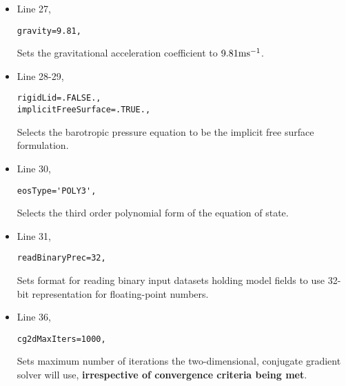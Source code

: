 \begin{itemize}
\item Line 27,
\begin{verbatim}
gravity=9.81,
\end{verbatim}
Sets the gravitational acceleration coefficient to $9.81{\rm m}{\rm s}^{-1}$.\\


\item Line 28-29,
\begin{verbatim}
rigidLid=.FALSE., 
implicitFreeSurface=.TRUE., 
\end{verbatim}
Selects the barotropic pressure equation to be the implicit free surface
formulation.

\item Line 30,
\begin{verbatim}
eosType='POLY3',
\end{verbatim}
Selects the third order polynomial form of the equation of state.\\

\item Line 31,
\begin{verbatim}
readBinaryPrec=32,
\end{verbatim}
Sets format for reading binary input datasets holding model fields to
use 32-bit representation for floating-point numbers.\\

\item Line 36,
\begin{verbatim}
cg2dMaxIters=1000,
\end{verbatim}
Sets maximum number of iterations the two-dimensional, conjugate
gradient solver will use, {\bf irrespective of convergence 
criteria being met}.\\


\end{itemize}
